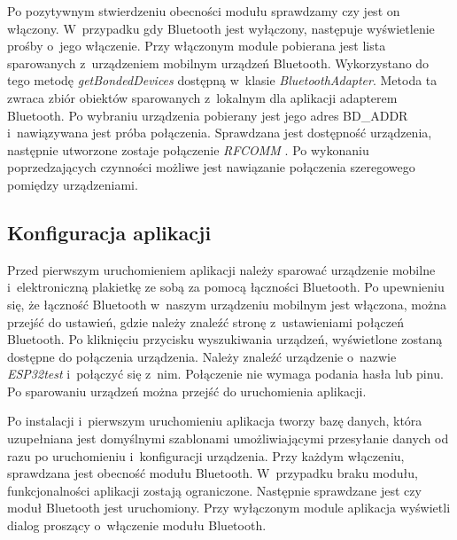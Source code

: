 \documentclass[a4paper,12pt, twoside]{article}
\begin{document}
    	Po pozytywnym stwierdzeniu obecności modułu sprawdzamy czy jest on włączony. W~przypadku gdy Bluetooth jest wyłączony, następuje wyświetlenie prośby o~jego włączenie. Przy włączonym module pobierana jest lista sparowanych z~urządzeniem mobilnym urządzeń Bluetooth. Wykorzystano do tego metodę \textit{getBondedDevices}\cite{bonded} dostępną w~klasie \textit{BluetoothAdapter}. Metoda ta zwraca zbiór obiektów sparowanych z~lokalnym dla aplikacji adapterem Bluetooth. Po wybraniu urządzenia pobierany jest jego adres BD\_ADDR i~nawiązywana jest próba połączenia. Sprawdzana jest dostępność urządzenia, następnie utworzone zostaje połączenie \textit{RFCOMM} \cite{rfcomm}. Po wykonaniu poprzedzających czynności możliwe jest nawiązanie połączenia szeregowego pomiędzy urządzeniami.
    	
    	\subsection{Konfiguracja aplikacji}
    	Przed pierwszym uruchomieniem aplikacji należy sparować urządzenie mobilne i~elektroniczną plakietkę ze sobą za pomocą łączności Bluetooth. Po upewnieniu się, że łączność Bluetooth w~naszym urządzeniu mobilnym jest włączona, można przejść do ustawień, gdzie należy znaleźć stronę z~ustawieniami połączeń Bluetooth. Po kliknięciu przycisku wyszukiwania urządzeń, wyświetlone zostaną dostępne do połączenia urządzenia. Należy znaleźć urządzenie o~nazwie \textit{ESP32test} i~połączyć się z~nim. Połączenie nie wymaga podania hasła lub pinu. Po sparowaniu urządzeń można przejść do uruchomienia aplikacji. 
    	
    	Po instalacji i~pierwszym uruchomieniu aplikacja tworzy bazę danych, która uzupełniana jest domyślnymi szablonami umożliwiającymi przesyłanie danych od razu po uruchomieniu i~konfiguracji urządzenia. Przy każdym włączeniu, sprawdzana jest obecność modułu Bluetooth. W~przypadku braku modułu, funkcjonalności aplikacji zostają ograniczone. Następnie sprawdzane jest czy moduł Bluetooth jest uruchomiony. Przy wyłączonym module aplikacja wyświetli dialog proszący o~włączenie modułu Bluetooth.
    	
\end{document}
